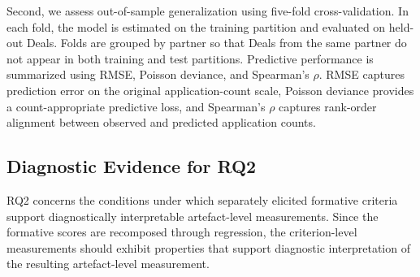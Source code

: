 Second, we assess out-of-sample generalization using five-fold cross-validation. In each fold, the model is estimated on the training partition and evaluated on held-out Deals. Folds are grouped by partner so that Deals from the same partner do not appear in both training and test partitions. Predictive performance is summarized using RMSE, Poisson deviance, and Spearman's $\rho$. RMSE captures prediction error on the original application-count scale, Poisson deviance provides a count-appropriate predictive loss, and Spearman's $\rho$ captures rank-order alignment between observed and predicted application counts.



\subsection{Diagnostic Evidence for RQ2}\label{sec:methods_diagnostics}

RQ2 concerns the conditions under which separately elicited formative criteria support diagnostically interpretable artefact-level measurements. Since the formative scores are recomposed through regression, the criterion-level measurements should exhibit properties that support diagnostic interpretation of the resulting artefact-level measurement.

